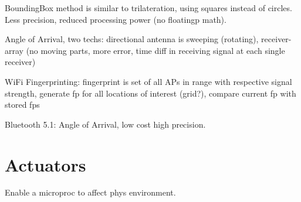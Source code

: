 \documentclass{article}
\begin{document}
\begin{multicols}{2}
    BoundingBox method is similar to trilateration, using squares instead of circles. Less precision, reduced processing power (no floatingp math).

    Angle of Arrival, two techs: directional antenna is sweeping (rotating), receiver-array (no moving parts, more error, time diff in receiving signal at each single receiver)

    WiFi Fingerprinting: fingerprint is set of all APs in range with respective signal strength, generate fp for all locations of interest (grid?), compare current fp with stored fps

    Bluetooth 5.1: Angle of Arrival, low cost high precision.

    \section{Actuators}

    Enable a microproc to affect phys environment.

\end{multicols}
\end{document}
